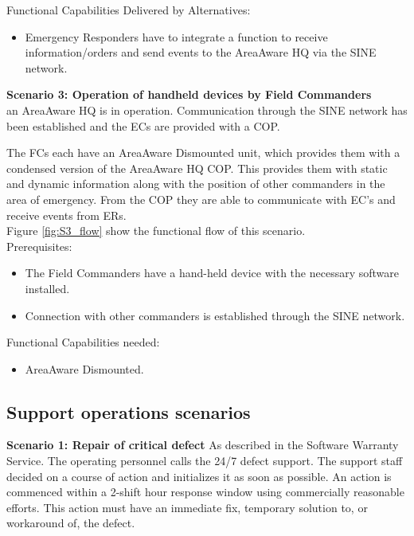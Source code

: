\noindent Functional Capabilities Delivered by Alternatives:
\begin{itemize}
	\item Emergency Responders have to integrate a function to receive information/orders and send events to the AreaAware HQ via the SINE network.
\end{itemize} 


\newpage
\noindent \textbf{Scenario 3: Operation of handheld devices by Field Commanders} \\
an AreaAware HQ is in operation. Communication through the SINE network has been established and the ECs are provided with a COP. 

The FCs each have an AreaAware Dismounted unit, which provides them with a condensed version of the AreaAware HQ COP. This provides them with static and dynamic information along with the position of other commanders in the area of emergency. From the COP they are able to communicate with EC's and receive events from ERs.\\
Figure \ref{fig:S3_flow} show the functional flow of this scenario. \\

\noindent Prerequisites:
\begin{itemize}
	\itemsep0em
	\item The Field Commanders have a hand-held device with the necessary software installed.
	\item Connection with other commanders is  established through the SINE network.
\end{itemize}

\noindent Functional Capabilities needed:
\begin{itemize}
	\item AreaAware Dismounted.
\end{itemize}


\newpage
\subsection{Support operations scenarios}
\noindent \textbf{Scenario 1: Repair of critical defect}
As described in the Software Warranty Service.
The operating personnel calls the 24/7 defect support. The support staff decided on a course of action and initializes it as soon as possible. An action is commenced within a 2-shift hour response window using commercially reasonable efforts. This action must have an immediate fix, temporary solution to, or workaround of, the defect.

